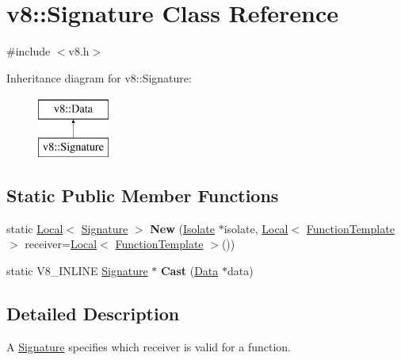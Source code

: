 \hypertarget{classv8_1_1Signature}{}\section{v8\+:\+:Signature Class Reference}
\label{classv8_1_1Signature}


{\ttfamily \#include $<$v8.\+h$>$}

Inheritance diagram for v8\+:\+:Signature\+:\begin{figure}[H]
\begin{center}
\leavevmode
\includegraphics[height=2.000000cm]{classv8_1_1Signature}
\end{center}
\end{figure}
\subsection*{Static Public Member Functions}
\begin{DoxyCompactItemize}
\item 
\mbox{\label{classv8_1_1Signature_a4e3d622674ec1f735e9981ec3309320f}} 
static \mbox{\hyperlink{classv8_1_1Local}{Local}}$<$ \mbox{\hyperlink{classv8_1_1Signature}{Signature}} $>$ {\bfseries New} (\mbox{\hyperlink{classv8_1_1Isolate}{Isolate}} $\ast$isolate, \mbox{\hyperlink{classv8_1_1Local}{Local}}$<$ \mbox{\hyperlink{classv8_1_1FunctionTemplate}{Function\+Template}} $>$ receiver=\mbox{\hyperlink{classv8_1_1Local}{Local}}$<$ \mbox{\hyperlink{classv8_1_1FunctionTemplate}{Function\+Template}} $>$())
\item 
\mbox{\label{classv8_1_1Signature_a9c7566555923187ca55c14af8048a9fc}} 
static V8\+\_\+\+I\+N\+L\+I\+NE \mbox{\hyperlink{classv8_1_1Signature}{Signature}} $\ast$ {\bfseries Cast} (\mbox{\hyperlink{classv8_1_1Data}{Data}} $\ast$data)
\end{DoxyCompactItemize}


\subsection{Detailed Description}
A \mbox{\hyperlink{classv8_1_1Signature}{Signature}} specifies which receiver is valid for a function.


